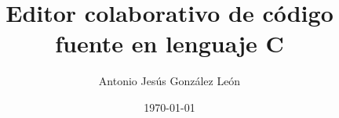 \documentclass[a4paper,11pt,twoside]{book}
\title{Editor colaborativo de código fuente en lenguaje C}
\author{Antonio Jesús González León}
\date{\today}
\begin{document}
        

        
        


        \frontmatter

        \tableofcontents
        \listoffigures
        \listoftables



        \mainmatter

	
	
	
	
	
	
	

	\nocite{*}	%
	
    	
\end{document}
